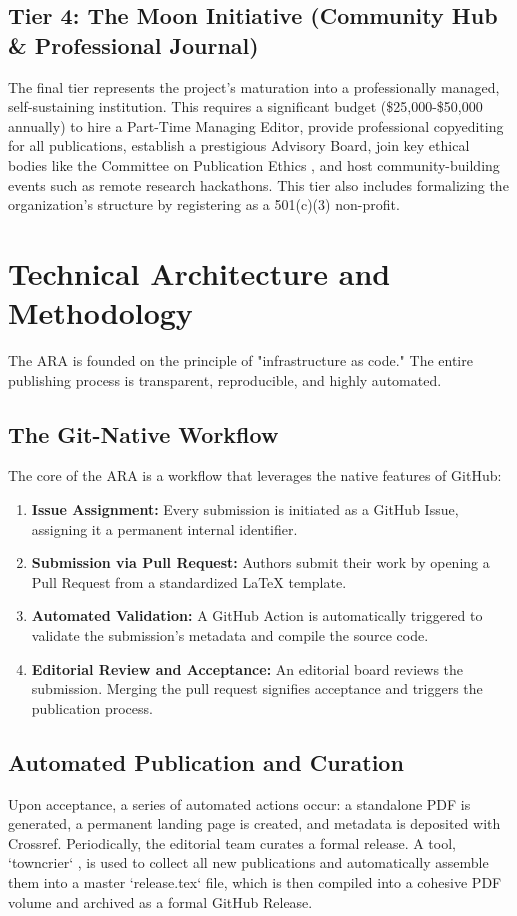 \documentclass[conference, compsoc, 11pt]{IEEEtran}
\begin{document}
\subsection{Tier 4: The Moon Initiative (Community Hub \& Professional Journal)}
The final tier represents the project's maturation into a professionally managed, self-sustaining institution. This requires a significant budget (\$25,000-\$50,000 annually) to hire a Part-Time Managing Editor, provide professional copyediting for all publications, establish a prestigious Advisory Board, join key ethical bodies like the Committee on Publication Ethics \cite{cope2025}, and host community-building events such as remote research hackathons. This tier also includes formalizing the organization's structure by registering as a 501(c)(3) non-profit.

\section{Technical Architecture and Methodology}

The ARA is founded on the principle of "infrastructure as code." The entire publishing process is transparent, reproducible, and highly automated.

\subsection{The Git-Native Workflow}
The core of the ARA is a workflow that leverages the native features of GitHub:
\begin{enumerate}
    \item \textbf{Issue Assignment:} Every submission is initiated as a GitHub Issue, assigning it a permanent internal identifier.
    \item \textbf{Submission via Pull Request:} Authors submit their work by opening a Pull Request from a standardized LaTeX template.
    \item \textbf{Automated Validation:} A GitHub Action is automatically triggered to validate the submission's metadata and compile the source code.
    \item \textbf{Editorial Review and Acceptance:} An editorial board reviews the submission. Merging the pull request signifies acceptance and triggers the publication process.
\end{enumerate}

\subsection{Automated Publication and Curation}
Upon acceptance, a series of automated actions occur: a standalone PDF is generated, a permanent landing page is created, and metadata is deposited with Crossref. Periodically, the editorial team curates a formal release. A tool, `towncrier` \cite{krekel2022}, is used to collect all new publications and automatically assemble them into a master `release.tex` file, which is then compiled into a cohesive PDF volume and archived as a formal GitHub Release.
\end{document}
